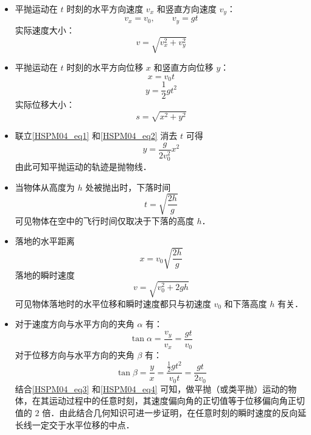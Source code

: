 \begin{itemize}
\item 平抛运动在 $t$ 时刻的水平方向速度 $v_x$ 和竖直方向速度 $v_y$：
\begin{equation}
v_x=v_0,\qquad 
v_y=gt
\end{equation}
实际速度大小：
\begin{equation}
v=\sqrt{v_x^2+v_y^2}
\end{equation}

\item 平抛运动在 $t$ 时刻的水平方向位移 $x$ 和竖直方向位移 $y$：
\begin{equation}\label{HSPM04_eq1}
x=v_0t
\end{equation}
\begin{equation}\label{HSPM04_eq2}
y=\frac12 gt^2
\end{equation}
实际位移大小：
\begin{equation}
s=\sqrt{x^2+y^2}
\end{equation}

\item 联立\autoref{HSPM04_eq1} 和\autoref{HSPM04_eq2} 消去 $t$ 可得
\begin{equation}
y=\frac{g}{2v_0^2}x^2
\end{equation}
由此可知平抛运动的轨迹是抛物线．

\item 当物体从高度为 $h$ 处被抛出时，下落时间
\begin{equation}\label{HSPM04_eq5}
t=\sqrt{\frac{2h}{g}}
\end{equation}
可见物体在空中的飞行时间仅取决于下落的高度 $h$．

\item 落地的水平距离
\begin{equation}
x=v_0\sqrt{\frac{2h}{g}}
\end{equation}
落地的瞬时速度
\begin{equation}
v=\sqrt{v_0^2+2gh}
\end{equation}
可见物体落地时的水平位移和瞬时速度都只与初速度 $v_0$ 和下落高度 $h$ 有关．

\item 对于速度方向与水平方向的夹角 $\alpha$ 有：
\begin{equation}\label{HSPM04_eq3}
\tan \alpha = \frac {v_y}{v_x}=\frac{gt}{v_0}
\end{equation}
对于位移方向与水平方向的夹角 $\beta$ 有：
\begin{equation}\label{HSPM04_eq4}
\tan \beta = \frac{y}{x}=\frac{\frac12 gt^2}{v_0t} = \frac{gt}{2v_0}
\end{equation}
结合\autoref{HSPM04_eq3} 和\autoref{HSPM04_eq4} 可知，做平抛（或类平抛）运动的物体，在其运动过程中的任意时刻，其速度偏向角的正切值等于位移偏向角正切值的 $2$ 倍．由此结合几何知识可进一步证明，在任意时刻的瞬时速度的反向延长线一定交于水平位移的中点．
\end{itemize}

